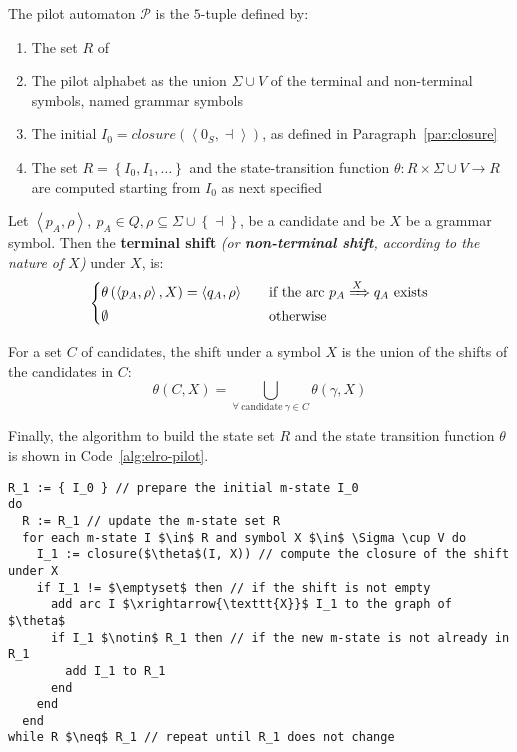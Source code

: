 \documentclass[english]{article}
\begin{document}
\bigskip
The pilot automaton \(\mathcal{P}\) is the \(5\)-tuple defined by:

\begin{enumerate}
  \item The set \(R\) of \mstates
  \item The pilot alphabet as the union \(\Sigma \cup V\) of the terminal and non-terminal symbols, named grammar symbols
  \item The initial \mstate \(I_0 = \textit{closure}\left( \left\langle 0_S, \dashv \right\rangle \right)\), as defined in Paragraph~\ref{par:closure}
  \item The \mstate set \(R = \left\{ I_0, I_1, \ldots \right\}\) and the state-transition function \(\theta: R \times \Sigma \cup V \rightarrow R\) are computed starting from \(I_0\) as next specified
\end{enumerate}

Let \(\left\langle p_A, \rho \right\rangle, \ p_A \in Q, \rho \subseteq \Sigma \cup \left\{ \dashv \right\}\), be a candidate and be \(X\) be a grammar symbol.
Then the \textbf{terminal shift} \textit{(or \textbf{non-terminal shift}, according to the nature of \(X\))} under \(X\), is:
\[\begin{cases}
    \theta \left( \left\langle p_A, \rho \right\rangle, X \right) = \left\langle q_A, \rho \right\rangle \quad & \text{if the arc} \ p_A \xRightarrow{X} q_A \ \text{exists} \\
    \emptyset \quad                                                                                            & \text{otherwise}
  \end{cases}\]

For a set \(C\) of candidates, the shift under a symbol \(X\) is the union of the shifts of the candidates in \(C\):
\[ \theta(C, X) = \bigcup_{\forall \ \text{candidate} \ \gamma \in C} \theta(\gamma, X) \]

Finally, the algorithm to build the state set \(R\) and the state transition function \(\theta\) is shown in Code~\ref{alg:elro-pilot}.

\begin{lstlisting}[caption={Algorithm to build the \ELRo pilot automaton}, label={alg:elro-pilot}]
R_1 := { I_0 } // prepare the initial m-state I_0
do
  R := R_1 // update the m-state set R
  for each m-state I $\in$ R and symbol X $\in$ \Sigma \cup V do
    I_1 := closure($\theta$(I, X)) // compute the closure of the shift under X
    if I_1 != $\emptyset$ then // if the shift is not empty
      add arc I $\xrightarrow{\texttt{X}}$ I_1 to the graph of $\theta$
      if I_1 $\notin$ R_1 then // if the new m-state is not already in R_1
        add I_1 to R_1
      end
    end
  end
while R $\neq$ R_1 // repeat until R_1 does not change
\end{lstlisting}
\end{document}

